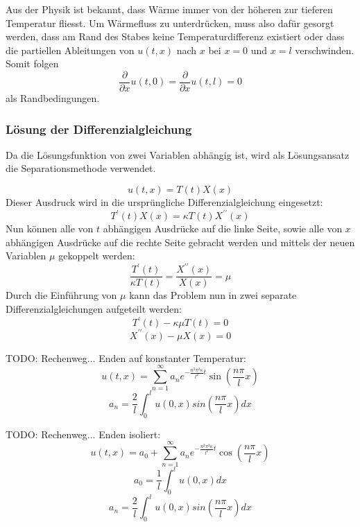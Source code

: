 Aus der Physik ist bekannt, dass Wärme immer von der höheren zur tieferen
Temperatur fliesst. Um Wärmefluss zu unterdrücken, muss also dafür gesorgt
werden, dass am Rand des Stabes keine Temperaturdifferenz existiert oder 
dass die partiellen Ableitungen von $u(t,x)$ nach $x$ bei $x = 0$ und $x = l$
verschwinden. Somit folgen
\[
    \frac{\partial}{\partial x} u(t, 0)
    =
    \frac{\partial}{\partial x} u(t, l)
    =
    0
\]
als Randbedingungen.


\subsubsection{Lösung der Differenzialgleichung}


Da die Lösungsfunktion von zwei Variablen abhängig ist, wird als Lösungsansatz
die Separationsmethode verwendet.

\[
    u(t,x)
    =
    T(t)X(x)
\]
Dieser Ausdruck wird in die ursprüngliche Differenzialgleichung eingesetzt:
\[
    T^{\prime}(t)X(x)
    =
    \kappa T(t)X^{\prime \prime}(x)
\]
Nun können alle von $t$ abhängigen Ausdrücke auf die linke Seite, sowie alle
von $x$ abhängigen Ausdrücke auf die rechte Seite gebracht werden und mittels
der neuen Variablen $\mu$ gekoppelt werden:
\[
    \frac{T^{\prime}(t)}{\kappa T(t)}
    =
    \frac{X^{\prime \prime}(x)}{X(x)}
    =
    \mu
\]
Durch die Einführung von $\mu$ kann das Problem nun in zwei separate
Differenzialgleichungen aufgeteilt werden:
\[
    T^{\prime}(t) - \kappa \mu T(t)
    =
    0
\]
\[
    X^{\prime \prime}(x) - \mu X(x)
    =
    0
\]

TODO: Rechenweg... Enden auf konstanter Temperatur:
\[
    u(t,x)
    =
    \sum_{n=1}^{\infty}a_{n}e^{-\frac{n^{2}\pi^{2}\kappa}{l^{2}}t}
    \sin\left(\frac{n\pi}{l}x\right)
\]
\[
    a_{n}
    =
    \frac{2}{l}\int_{0}^{l}u(0,x)sin\left(\frac{n\pi}{l}x\right) dx
\]

TODO: Rechenweg... Enden isoliert:
\[
    u(t,x)
    =
    a_{0} + \sum_{n=1}^{\infty}a_{n}e^{-\frac{n^{2}\pi^{2}\kappa}{l^{2}}t}
    \cos\left(\frac{n\pi}{l}x\right)
\]
\[
    a_{0}
    =
    \frac{1}{l}\int_{0}^{l}u(0,x) dx
\]
\[
    a_{n}
    =
    \frac{2}{l}\int_{0}^{l}u(0,x)sin\left(\frac{n\pi}{l}x\right) dx
\]
